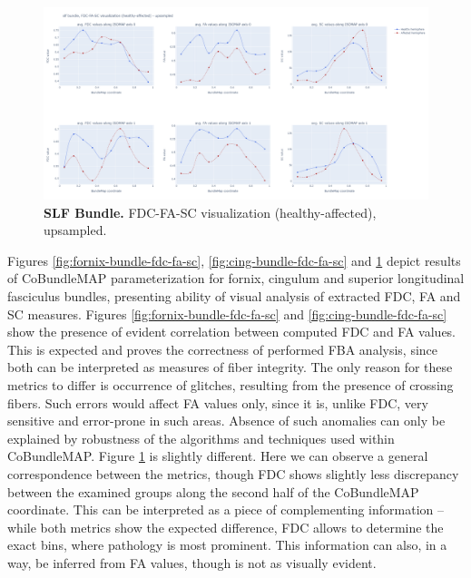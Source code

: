 \documentclass[thesis.tex]{subfiles}
\begin{document}
\begin{figure}
    \centering
  \includegraphics[width=24cm]{thesis_radomskyi/images/slf bundle, FDC-FA-SC visualization (healthy-affected) - upsampled.png}
    \caption{\textbf{SLF Bundle.} FDC-FA-SC visualization (healthy-affected), upsampled.}
    \label{fig:slf-bundle-fdc-fa-sc}
\end{figure}
Figures  \ref{fig:fornix-bundle-fdc-fa-sc}, \ref{fig:cing-bundle-fdc-fa-sc} and \ref{fig:slf-bundle-fdc-fa-sc} depict results of CoBundleMAP parameterization for fornix, cingulum and superior longitudinal fasciculus bundles, presenting ability of visual analysis of extracted FDC, FA and SC measures. Figures \ref{fig:fornix-bundle-fdc-fa-sc} and \ref{fig:cing-bundle-fdc-fa-sc} show the presence of evident correlation between computed FDC and FA values. This is expected and proves the correctness of performed FBA analysis, since both can be interpreted as measures of fiber integrity. The only reason for these metrics to differ is occurrence of glitches, resulting from the presence of crossing fibers. Such errors would affect FA values only, since it is, unlike FDC, very sensitive and error-prone in such areas. Absence of such anomalies can only be explained by robustness of the algorithms and techniques used within CoBundleMAP. Figure \ref{fig:slf-bundle-fdc-fa-sc} is slightly different. Here we can observe a general correspondence between the metrics, though FDC shows slightly less discrepancy between the examined groups along the second half of the CoBundleMAP coordinate. This can be interpreted as a piece of complementing information -- while both metrics show the expected difference, FDC allows to determine the exact bins, where pathology is most prominent. This information can also, in a way, be inferred from FA values, though is not as visually evident.
\end{document}
